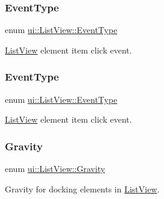 \subsubsection{\texorpdfstring{Event\+Type}{EventType}\hspace{0.1cm}{\footnotesize\ttfamily [1/2]}}
{\footnotesize\ttfamily enum \hyperlink{classui_1_1ListView_a7ef851492220e4bccadbaf16d95d26b9}{ui\+::\+List\+View\+::\+Event\+Type}\hspace{0.3cm}{\ttfamily [strong]}}

\hyperlink{classui_1_1ListView}{List\+View} element item click event. \mbox{\label{classui_1_1ListView_a7ef851492220e4bccadbaf16d95d26b9}} 
\subsubsection{\texorpdfstring{Event\+Type}{EventType}\hspace{0.1cm}{\footnotesize\ttfamily [2/2]}}
{\footnotesize\ttfamily enum \hyperlink{classui_1_1ListView_a7ef851492220e4bccadbaf16d95d26b9}{ui\+::\+List\+View\+::\+Event\+Type}\hspace{0.3cm}{\ttfamily [strong]}}

\hyperlink{classui_1_1ListView}{List\+View} element item click event. \mbox{\label{classui_1_1ListView_af79b44631b38c1782c384830acf20cf6}} 
\subsubsection{\texorpdfstring{Gravity}{Gravity}\hspace{0.1cm}{\footnotesize\ttfamily [1/2]}}
{\footnotesize\ttfamily enum \hyperlink{classui_1_1ListView_af79b44631b38c1782c384830acf20cf6}{ui\+::\+List\+View\+::\+Gravity}\hspace{0.3cm}{\ttfamily [strong]}}

Gravity for docking elements in \hyperlink{classui_1_1ListView}{List\+View}. \mbox{\label{classui_1_1ListView_af79b44631b38c1782c384830acf20cf6}} 
